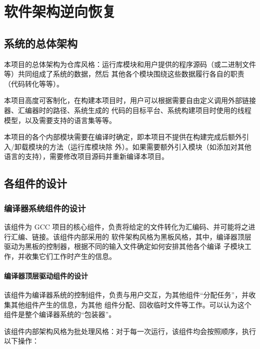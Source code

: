 \documentclass[12pt]{ctexrep}
\begin{document}
    \chapter{软件架构逆向恢复}
    \section{系统的总体架构}

    本项目的总体架构为仓库风格：运行库模块和用户提供的程序源码（或二进制文件等）共同组成了系统的数据，然后
    其他各个模块围绕这些数据履行各自的职责（代码转化等等）。

    本项目高度可客制化，在构建本项目时，用户可以根据需要自由定义调用外部链接器、汇编器时的路径、系统生成的
    代码的目标平台、系统构建项目时使用的线程模型，以及需要支持的语言集等等。\cite{gcc-configure}

    本项目的各个内部模块需要在编译时确定，即本项目不提供在构建完成后额外引入/卸载模块的方法（运行库模块除
    外）。如果需要额外引入模块（如添加对其他语言的支持），需要修改项目源码并重新编译本项目。

    \section{各组件的设计}
    \subsection{编译器系统组件的设计}

    该组件为 GCC 项目的核心组件，负责将给定的文件转化为汇编码、并可能将之进行汇编、链接。该组件内部采用的
    软件架构风格为黑板风格，其中，编译器顶层驱动为黑板的控制器，根据不同的输入文件确定如何安排其他各个编译
    子模块工作，并收集它们工作时产生的信息。

    \subsubsection{编译器顶层驱动组件的设计}

    该组件为编译器系统的控制组件，负责与用户交互，为其他组件``分配任务''，并收集其他组件产生的信息，为其他
    组件分配、回收临时文件等工作。可以认为这个组件是整个编译器系统的``包装器''。

    该组件内部架构风格为批处理风格：对于每一次运行，该组件均会按照顺序，执行以下操作：
\end{document}

